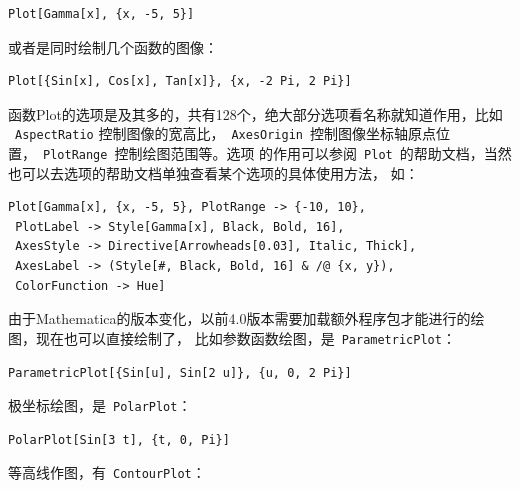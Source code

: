\documentclass[UTF8,a4paper,10pt]{ctexart}
\begin{document}
\begin{lstlisting}
Plot[Gamma[x], {x, -5, 5}]
\end{lstlisting}

或者是同时绘制几个函数的图像：

\begin{lstlisting}
Plot[{Sin[x], Cos[x], Tan[x]}, {x, -2 Pi, 2 Pi}]
\end{lstlisting}

函数Plot的选项是及其多的，共有128个，绝大部分选项看名称就知道作用，比如 ~\verb|AspectRatio|
控制图像的宽高比，~\verb|AxesOrigin|~控制图像坐标轴原点位置，~\verb|PlotRange|~控制绘图范围等。选项
的作用可以参阅~\verb|Plot|~的帮助文档，当然也可以去选项的帮助文档单独查看某个选项的具体使用方法，
如：


\begin{lstlisting}
Plot[Gamma[x], {x, -5, 5}, PlotRange -> {-10, 10}, 
 PlotLabel -> Style[Gamma[x], Black, Bold, 16], 
 AxesStyle -> Directive[Arrowheads[0.03], Italic, Thick], 
 AxesLabel -> (Style[#, Black, Bold, 16] & /@ {x, y}), 
 ColorFunction -> Hue]
\end{lstlisting}

由于Mathematica的版本变化，以前4.0版本需要加载额外程序包才能进行的绘图，现在也可以直接绘制了，
比如参数函数绘图，是~\verb|ParametricPlot|：

\begin{lstlisting}
ParametricPlot[{Sin[u], Sin[2 u]}, {u, 0, 2 Pi}]
\end{lstlisting}

极坐标绘图，是~\verb|PolarPlot|：

\begin{lstlisting}
PolarPlot[Sin[3 t], {t, 0, Pi}]
\end{lstlisting}

等高线作图，有~\verb|ContourPlot|：

\end{document}
